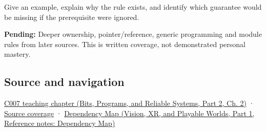 \hypertarget{appendix-2e4d494c2d94-recall-and-next-depth}{}

Give an example, explain why the rule exists, and identify which guarantee would be missing if the prerequisite were ignored.

\textbf{Pending:} Deeper ownership, pointer/reference, generic programming and module rules from later sources. This is written coverage, not demonstrated personal mastery.

\subsection{Source and navigation}\label{appendix-2e4d494c2d94-source-and-navigation}

\hypertarget{appendix-2e4d494c2d94-source-and-navigation}{}

\href{../01-Bits-Programs-and-Reliable-Systems-P02/main.pdf\#nameddest=01-foundations-i-ch002-promises-become-definitions}{C007 teaching chapter (Bits, Programs, and Reliable Systems, Part 2, Ch. 2)} · \hyperref[appendix-fd090d982a15-m007---parts-101-112]{Source coverage} · \href{../07-Vision-XR-and-Playable-Worlds-P01/main.pdf\#nameddest=appendix-4ad47bdd269a}{Dependency Map (Vision, XR, and Playable Worlds, Part 1, Reference notes: Dependency Map)}
